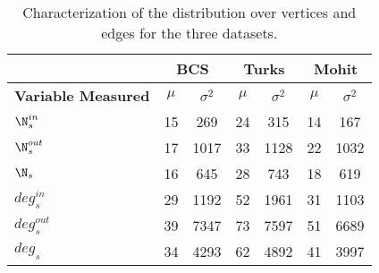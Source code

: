 \begin{table}
\small
\centering
\begin{tabular}{|l|cc|cc|cc|}
	\hline 
	& \multicolumn{2}{c|}{\bf BCS}
	& \multicolumn{2}{c|}{\bf Turks} 
	& \multicolumn{2}{c|}{\bf Mohit} \\
	\hline 
	\bf Variable Measured
	& \bf $\mu$ & \bf $\sigma^2$ 
	& \bf $\mu$ & \bf $\sigma^2$ 
	& \bf $\mu$ & \bf $\sigma^2$ \\
	\hline
	$\N^{in}_s$   & 15 & 269  & 24 & 315  & 14 & 167  \\
	$\N^{out}_s$  & 17 & 1017 & 33 & 1128 & 22 & 1032 \\
	$\N_s$        & 16 & 645  & 28 & 743  & 18 & 619  \\
	\hline
	\hline
	$deg^{in}_s$   & 29 & 1192 & 52 & 1961 & 31 & 1103 \\
	$deg^{out}_s$  & 39 & 7347 & 73 & 7597 & 51 & 6689 \\
	$deg_s$        & 34 & 4293 & 62 & 4892 & 41 & 3997 \\
	\hline
\end{tabular}
\caption{\label{font-table} Characterization of the distribution over vertices and edges for the three datasets.}
\end{table}\newpage


























